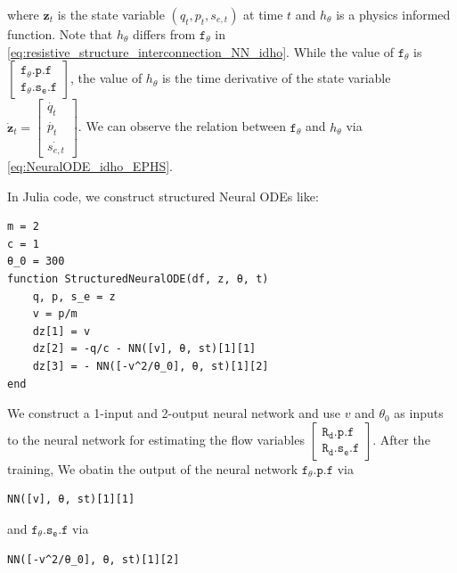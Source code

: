 \documentclass[
	parskip, 			   %
	twoside, 			   %
	DIV=14, 			   %
	BCOR=15.0mm, 		   %
	headsepline, 		   %
	open=right, 		   %
	captions=tableheading, %
	bibliography=totoc,    %
	numbers=noenddot       %
]{scrreprt}
\begin{document}
where $\mathbf{z}_t$ is the state variable $(q_t, p_t, s_{e,t})$ at time $t$ and $h_{\theta}$ is a physics informed function. Note that $h_{\theta}$ differs from $\mathtt{f_{\theta}}$ in \ref{eq:resistive_structure_interconnection_NN_idho}. While the value of $\mathtt{f_{\theta}}$ is $ \left[\begin{array}{l}\mathtt{f_{\theta}.p.f} \\ \mathtt{f_{\theta}.s_{e}.f}\end{array}\right]$, the value of $h_{\theta}$ is the time derivative of the state variable $\dot{\mathbf{z}}_t = \begin{bmatrix}\dot{q_t}\\ \dot{p_t}\\ \dot{s_{e,t}}\end{bmatrix}$. We can observe the relation between $\mathtt{f_{\theta}}$ and $h_{\theta}$ via \ref{eq:NeuralODE_idho_EPHS}.

In Julia code, we construct structured Neural ODEs like:

\begin{verbatim}
m = 2
c = 1
θ_0 = 300
function StructuredNeuralODE(df, z, θ, t)
    q, p, s_e = z
    v = p/m
    dz[1] = v
    dz[2] = -q/c - NN([v], θ, st)[1][1]
    dz[3] = - NN([-v^2/θ_0], θ, st)[1][2]
end
\end{verbatim}

We construct a 1-input and 2-output neural network and use $v$ and $\theta_0$ as inputs to the neural network for estimating the flow variables $\left[\begin{array}{l}\mathtt{R_{d}.p.f} \\ \mathtt{R_{d}.s_{e}.f}\end{array}\right]$. After the training, We obatin the output of the neural network $\mathtt{f_{\theta}.p.f}$ via

\begin{verbatim}
NN([v], θ, st)[1][1]
\end{verbatim}

and $\mathtt{f_{\theta}.s_{e}.f}$ via

\begin{verbatim}
NN([-v^2/θ_0], θ, st)[1][2]
\end{verbatim}
\end{document}

